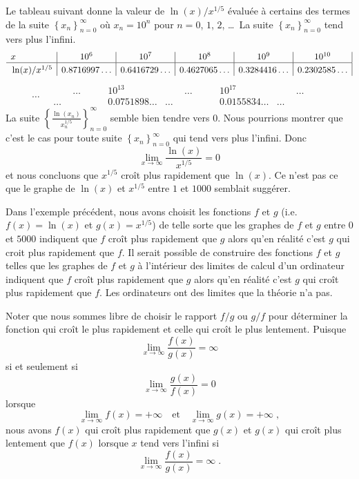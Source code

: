 {\begin{egg}
Le tableau suivant donne la valeur de $\ln(x)/x^{1/5}$ évaluée à
certains des termes de la suite
$\displaystyle \left\{ x_n \right\}_{n=0}^\infty$ où
$x_n = 10^n$ pour $n=0$, $1$, $2$, \ldots\  La suite
$\displaystyle \left\{ x_n \right\}_{n=0}^\infty$ tend vers plus
l'infini.
\[
\begin{array}{l|c|c|c|c|c|}
x & 10^6 & 10^7 & 10^8 & 10^9 & 10^{10} \\
\hline
\rule[-0.2ex]{0em}{1.2em} \ln(x)/x^{1/5} & 0.8716997\ldots &
0.6416729\ldots & 0.4627065\ldots & 0.3284416\ldots & 0.2302585\ldots
\end{array}
\]
\[
\ldots \quad
\begin{array}{|c|c|c|c|c}
\qquad \ldots \qquad & 10^{13} & \qquad \ldots \qquad & 10^{17} &
\qquad \ldots \qquad \\
\hline
\ldots & 0.0751898\ldots & \ldots & 0.0155834\ldots & \ldots
\end{array}
\]
La suite
$\displaystyle \left\{ \frac{\ln(x_n)}{x_n^{1/5}} \right\}_{n=0}^\infty$
semble bien tendre vers $0$.  Nous pourrions montrer que c'est le cas
pour toute suite
$\displaystyle \left\{ x_n \right\}_{n=0}^\infty$ qui tend vers plus
l'infini.  Donc
\[
\lim_{x\rightarrow \infty} \frac{\ln(x)}{x^{1/5}} = 0
\]
et nous concluons que $x^{1/5}$ croît plus rapidement que $\ln(x)$.  Ce
n'est pas ce que le graphe de $\ln(x)$ et $x^{1/5}$ entre $1$ et
$1000$ semblait suggérer.
\label{egg_hosp1}
\end{egg}


\begin{rmk}
Dans l'exemple précédent, nous avons choisit les fonctions $f$ et $g$ (i.e.
$f(x) = \ln(x)$ et $g(x)=x^{1/5}$) de telle sorte que les graphes de
$f$ et $g$ entre $0$ et $5000$ indiquent que $f$ croît plus rapidement
que $g$ alors qu'en réalité c'est $g$ qui croit plus rapidement que
$f$.  Il serait possible de construire des fonctions $f$ et $g$ telles
que les graphes de $f$ et $g$ à l'intérieur des limites de calcul d'un
ordinateur indiquent que $f$ croît plus rapidement que $g$ alors qu'en
réalité c'est $g$ qui croît plus rapidement que $f$.  Les ordinateurs
ont des limites que la théorie n'a pas.
\end{rmk}

Noter que nous sommes libre de choisir le rapport $f/g$ ou $g/f$ pour
déterminer la fonction qui croît le plus rapidement et celle qui croît
le plus lentement.  Puisque
\[
\lim_{x \rightarrow \infty} \frac{f(x)}{g(x)} = \infty
\]
si et seulement si
\[
\lim_{x \rightarrow \infty} \frac{g(x)}{f(x)} = 0
\]
lorsque
\[
\lim_{x \rightarrow \infty} f(x) = +\infty \quad \text{et} \quad
\lim_{x \rightarrow \infty} g(x) = +\infty \; ,
\]
nous avons $f(x)$ qui croît plus rapidement que $g(x)$ et $g(x)$ qui croît
plus lentement que $f(x)$ lorsque $x$ tend vers l'infini si
\[
\lim_{x \rightarrow \infty} \frac{f(x)}{g(x)} = \infty \; .
\]

}
